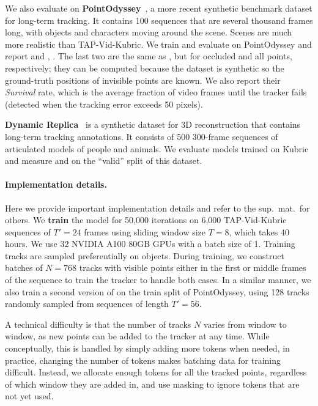 We also evaluate on \textbf{PointOdyssey}~\cite{zheng2023pointodyssey}, a more recent synthetic benchmark dataset for long-term tracking.
It contains 100 sequences that are several thousand frames long, with objects and characters moving around the scene.
Scenes are much more realistic than TAP-Vid-Kubric.
We train and evaluate \method on PointOdyssey and report \davgvis and \davgocc, \davg.
The last two are the same as \davgvis, but for occluded and all points, respectively;
they can be computed because the dataset is synthetic so the ground-truth positions of invisible points are known.
We also report their \emph{Survival} rate, which is the average fraction of video frames until the tracker fails (detected when the tracking error exceeds 50 pixels).

\textbf{Dynamic Replica}~\cite{karaev2023dynamicstereo} is a synthetic dataset for 3D reconstruction that contains long-term tracking annotations.
It consists of 500 300-frame sequences of articulated models of people and animals.
We evaluate models trained on Kubric and measure \davgvis and \davgocc on the ``valid'' split of this dataset.

\paragraph{Implementation details.}

Here we provide important implementation details and refer to the sup.~mat.~for others.
We \textbf{train} the model for 50,000 iterations on 6,000 TAP-Vid-Kubric sequences of $T'=24$ frames using sliding window size $T=8$, which takes 40 hours.
We use $32$ NVIDIA A100 80GB GPUs with a batch size of 1.
Training tracks are sampled preferentially on objects.
During training, we construct batches of $N=768$ tracks with visible points either in the first or middle frames of the sequence to train the tracker to handle both cases.
In a similar manner, we also train a second version of \method on the train split of PointOdyssey, using 128 tracks randomly sampled from sequences of length $T'=56$.

A technical difficulty is that the number of tracks $N$ varies from window to window, as new points can be added to the tracker at any time.
While conceptually, this is handled by simply adding more tokens when needed, in practice, changing the number of tokens makes batching data for training difficult.
Instead, we allocate enough tokens for all the tracked points, regardless of which window they are added in, and use masking to ignore tokens that are not yet used.

